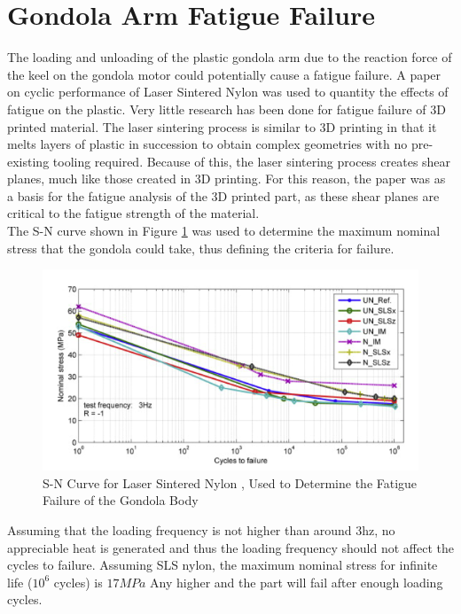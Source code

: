\documentclass[../main.tex]{subfiles}
\begin{document}
\section{Gondola Arm Fatigue Failure} \label{armFatigue}
The loading and unloading of the plastic gondola arm due to the reaction force of the keel on the gondola motor could potentially cause a fatigue failure. A paper on cyclic performance of Laser Sintered Nylon \cite{fatiguePlastic} was used to quantity the effects of fatigue on the plastic. Very little research has been done for fatigue failure of 3D printed material. The laser sintering process is similar to 3D printing in that it melts layers of plastic in succession to obtain complex geometries with no pre-existing tooling required. Because of this, the laser sintering process creates shear planes, much like those created in 3D printing. For this reason, the paper was as a basis for the fatigue analysis of the 3D printed part, as these shear planes are critical to the fatigue strength of the material. \\

The S-N curve shown in Figure \ref{fig:snCurve} was used to determine the maximum nominal stress that the gondola could take, thus defining the criteria for failure.

\begin{figure}[H]
	\centering
	\includegraphics[width=.8\linewidth]{img/gondola/snCurve.PNG}
	\caption{S-N Curve for Laser Sintered Nylon \cite{fatiguePlastic}, Used to Determine the Fatigue Failure of the Gondola Body}
	\label{fig:snCurve}
\end{figure}

Assuming that the loading frequency is not higher than around 3hz, no appreciable heat is generated and thus the loading frequency should not affect the cycles to failure. Assuming SLS nylon, the maximum nominal stress for infinite life ($10^6$ cycles) is $17MPa$ Any higher and the part will fail after enough loading cycles.\\
\end{document}
